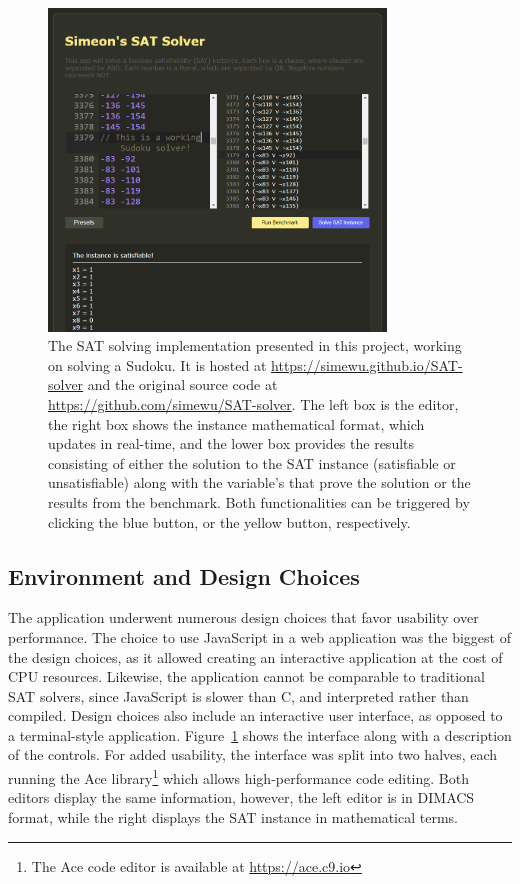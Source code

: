 \documentclass[runningheads]{llncs}
\begin{document}
\begin{figure}[h]
\centering
\includegraphics[width=0.8\textwidth]{Figures/screenshot.png}
\caption{The SAT solving implementation presented in this project, working on solving a Sudoku. It is hosted at \url{https://simewu.github.io/SAT-solver} and the original source code at \url{https://github.com/simewu/SAT-solver}. The left box is the editor, the right box shows the instance mathematical format, which updates in real-time, and the lower box provides the results consisting of either the solution to the SAT instance (satisfiable or unsatisfiable) along with the variable's that prove the solution or the results from the benchmark. Both functionalities can be triggered by clicking the blue button, or the yellow button, respectively.}
\label{fig:screenshot}
\end{figure}

\subsection{Environment and Design Choices}
The application underwent numerous design choices that favor usability over performance. The choice to use JavaScript in a web application was the biggest of the design choices, as it allowed creating an interactive application at the cost of CPU resources. Likewise, the application cannot be comparable to traditional SAT solvers, since JavaScript is slower than C, and interpreted rather than compiled. Design choices also include an interactive user interface, as opposed to a terminal-style application. Figure~\ref{fig:screenshot} shows the interface along with a description of the controls. For added usability, the interface was split into two halves, each running the Ace library\footnote{The Ace code editor is available at \url{https://ace.c9.io}} which allows high-performance code editing. Both editors display the same information, however, the left editor is in DIMACS format, while the right displays the SAT instance in mathematical terms.
\end{document}
